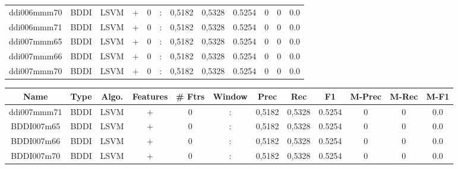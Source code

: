 \documentclass[a4paper]{article}
\begin{document}
\begin{landscape}
\begin{center}
\begin{tabular}{ |c|c|c|c|c|c|c|c|c|c|c|c|}
 
 	
 	\small{ ddi006mmm70 } & BDDI & LSVM & +  &  0 &  :  &  0,5182 & 0,5328 & 0.5254  &  0 & 0 & 0.0 \\
 	

 
 	
 	\small{ ddi006mmm71 } & BDDI & LSVM & +  &  0 &  :  &  0,5182 & 0,5328 & 0.5254  &  0 & 0 & 0.0 \\
 	

 
 	
 	\small{ ddi007mmm65 } & BDDI & LSVM & +  &  0 &  :  &  0,5182 & 0,5328 & 0.5254  &  0 & 0 & 0.0 \\
 	

 
 	
 	\small{ ddi007mmm66 } & BDDI & LSVM & +  &  0 &  :  &  0,5182 & 0,5328 & 0.5254  &  0 & 0 & 0.0 \\
 	

 
 	
 	\small{ ddi007mmm70 } & BDDI & LSVM & +  &  0 &  :  &  0,5182 & 0,5328 & 0.5254  &  0 & 0 & 0.0 \\
 	
 \hline
\end{tabular}
\end{center}




\begin{center}
\begin{tabular}{ |c|c|c|c|c|c|c|c|c|c|c|c|} 
 \hline
 	Name & Type & Algo. & Features & \# Ftrs & Window & Prec & Rec & F1 & M-Prec & M-Rec & M-F1\\
 \hline

 	

 
 	
 	\small{ ddi007mmm71 } & BDDI & LSVM & +  &  0 &  :  &  0,5182 & 0,5328 & 0.5254  &  0 & 0 & 0.0 \\
 	

 
 	
 	\small{ BDDI007m65 } & BDDI & LSVM & +  &  0 &  :  &  0,5182 & 0,5328 & 0.5254  &  0 & 0 & 0.0 \\
 	

 
 	
 	\small{ BDDI007m66 } & BDDI & LSVM & +  &  0 &  :  &  0,5182 & 0,5328 & 0.5254  &  0 & 0 & 0.0 \\
 	

 
 	
 	\small{ BDDI007m70 } & BDDI & LSVM & +  &  0 &  :  &  0,5182 & 0,5328 & 0.5254  &  0 & 0 & 0.0 \\
 	


\end{tabular}
\end{center}
\end{landscape}
\end{document}
